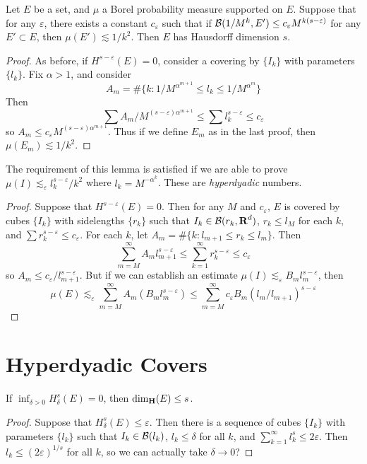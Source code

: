 \begin{theorem}
	Let $E$ be a set, and $\mu$ a Borel probability measure supported on $E$. Suppose that for any $\varepsilon$, there exists a constant $c_\varepsilon$ such that if $\operatorname{\mathcal{B}}(1/M^k,E') \leq c_\varepsilon M^{k(s-\varepsilon)}$ for any $E' \subset E$, then $\mu(E') \lesssim 1/k^2$. Then $E$ has Hausdorff dimension $s$.
\end{theorem}
\begin{proof}
	As before, if $H^{s-\varepsilon}(E) = 0$, consider a covering by $\{ I_k \}$ with parameters $\{ l_k \}$. Fix $\alpha > 1$, and consider
	\[ A_m = \# \{ k : 1/M^{\alpha^{m + 1}} \leq l_k \leq 1/M^{\alpha^m} \} \]
	Then
	\[ \sum A_m/M^{(s - \varepsilon) \alpha^{m+1}} \leq \sum l_k^{s - \varepsilon} \leq c_\varepsilon \]
	so $A_m \leq c_\varepsilon M^{(s - \varepsilon) \alpha^{m+1}}$. Thus if we define $E_m$ as in the last proof, then $\mu(E_m) \lesssim 1/k^2$.
\end{proof}

The requirement of this lemma is satisfied if we are able to prove $\mu(I) \lesssim_\varepsilon l_k^{s - \varepsilon}/k^2$ where $l_k = M^{- \alpha^k}$. These are \emph{hyperdyadic} numbers.

\begin{proof}
	Suppose that $H^{s-\varepsilon}(E) = 0$. Then for any $M$ and $c_\varepsilon$, $E$ is covered by cubes $\{ I_k \}$ with sidelengths $\{ r_k \}$ such that $I_k \in \operatorname{\mathcal{B}}(r_k,\operatorname{\mathbf{R}}^d)$, $r_k \leq l_M$ for each $k$, and $\sum r_k^{s - \varepsilon} \leq c_\varepsilon$. For each $k$, let $A_m = \# \{ k: l_{m+1} \leq r_k \leq l_m \}$. Then
	\[ \sum_{m = M}^\infty A_m l_{m+1}^{s - \varepsilon} \leq \sum_{k = 1}^\infty r_k^{s - \varepsilon} \leq c_\varepsilon \]
	so $A_m \leq c_\varepsilon / l_{m+1}^{s-\varepsilon}$. But if we can establish an estimate $\mu(I) \lesssim_\varepsilon B_m l_m^{s - \varepsilon}$, then 
	\[ \mu(E) \lesssim_\varepsilon \sum_{m = M}^\infty A_m (B_m l_m^{s - \varepsilon}) \leq \sum_{m = M}^\infty c_\varepsilon B_m (l_m/l_{m+1})^{s - \varepsilon} \]
\end{proof}

\section{Hyperdyadic Covers}

\begin{theorem}
	If $\inf_{\delta > 0} H^s_\delta(E) = 0$, then $\operatorname{\dim_{\mathbf{H}}}(E) \leq s$.
\end{theorem}
\begin{proof}
	Suppose that $H^s_\delta(E) \leq \varepsilon$. Then there is a sequence of cubes $\{ I_k \}$ with parameters $\{ l_k \}$ such that $I_k \in \operatorname{\mathcal{B}}(l_k)$, $l_k \leq \delta$ for all $k$, and $\sum_{k = 1}^\infty l_k^s \leq 2\varepsilon$. Then $l_k \leq (2\varepsilon)^{1/s}$ for all $k$, so we can actually take $\delta \to 0$?
\end{proof}

